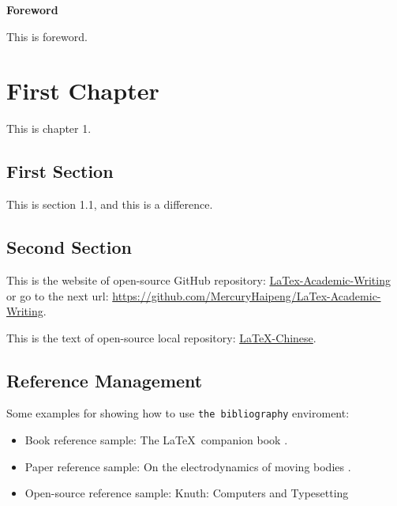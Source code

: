 \documentclass{book}
\begin{document}
\frontmatter
\tableofcontents
\clearpage
{}
{\huge{\bf Foreword}}

This is foreword.
\clearpage

\mainmatter
\chapter{First Chapter}
This is chapter 1.
\clearpage

\section{First Section} \label{second}
This is section 1.1, and this is a difference.



\section{Second Section}
This is the website of open-source GitHub 
repository: \href{https://github.com/MercuryHaipeng/LaTex-Academic-Writing}{LaTex-Academic-Writing} or go to the next url: \url{https://github.com/MercuryHaipeng/LaTex-Academic-Writing}.

This is the text of open-source local repository: \href{run:../Chinese-Document.pdf}{LaTeX-Chinese}. 


\section{Reference Management}
Some examples for showing how to use \texttt{the bibliography} enviroment:
\begin{itemize}
    \item Book reference sample: The \LaTeX\ companion book \cite{latexcompanion}.
    \item Paper reference sample: On the electrodynamics of moving bodies \citet{einstein}.
    \item Open-source reference sample: Knuth: Computers and Typesetting \citep{knuthwebsite}
\end{itemize}
\end{document}
